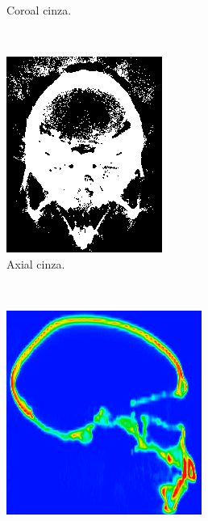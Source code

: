 \documentclass{article}
\begin{document}
\begin{figure}[H]
\begin{subfigure}[b]{0.3\textwidth}
        \caption{Coroal cinza.}
    \end{subfigure}
    ~
    \begin{subfigure}[b]{0.3\textwidth}
        \includegraphics[width=\textwidth]{skull/neuroradiologist-axial-gray.png}
        \caption{Axial cinza.}
    \end{subfigure}
    ~
    \begin{subfigure}[b]{0.3\textwidth}
        \includegraphics[width=\textwidth]{skull/neuroradiologist-sagital.png}

\end{subfigure}
\end{figure}
\end{document}
